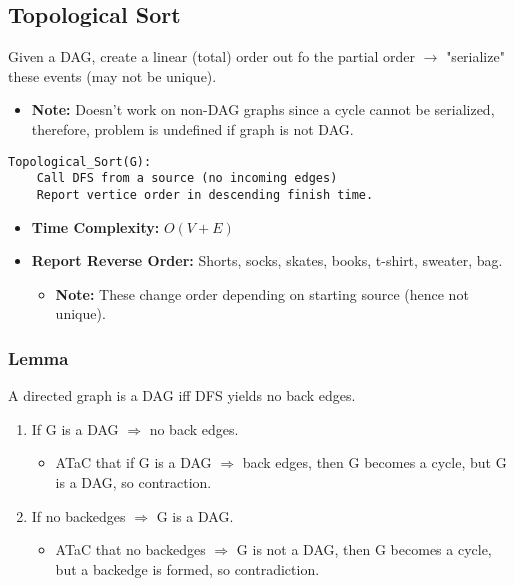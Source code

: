 \subsection{Topological Sort}
\begin{definition}
    Given a DAG, create a linear (total) order out fo the partial order $\rightarrow$ "serialize" these events (may not be unique).
    \begin{itemize}
        \item \textbf{Note:} Doesn't work on non-DAG graphs since a cycle cannot be serialized, therefore, problem is undefined if graph is not DAG.
    \end{itemize}
    
\begin{lstlisting}
Topological_Sort(G):
    Call DFS from a source (no incoming edges)
    Report vertice order in descending finish time. 
\end{lstlisting}
\begin{itemize}
    \item \textbf{Time Complexity:} $O(V+E)$
    \item \textbf{Report Reverse Order:} Shorts, socks, skates, books, t-shirt, sweater, bag.
    \begin{itemize}
        \item \textbf{Note:} These change order depending on starting source (hence not unique).
    \end{itemize}
\end{itemize}
\end{definition}

\begin{example}
\end{example}

\subsubsection{Lemma}
\begin{theorem}
    A directed graph is a DAG iff DFS yields no back edges.
\end{theorem}

\begin{derivation}
    \begin{enumerate}
        \item If G is a DAG $\Rightarrow$ no back edges. 
        \begin{itemize}
            \item ATaC that if G is a DAG $\Rightarrow$ back edges, then G becomes a cycle, but G is a DAG, so contraction.
        \end{itemize}
        \item If no backedges $\Rightarrow$ G is a DAG. 
        \begin{itemize}
            \item ATaC that no backedges $\Rightarrow$ G is not a DAG, then G becomes a cycle, but a backedge is formed, so contradiction.
        \end{itemize}
    \end{enumerate}
\end{derivation}

